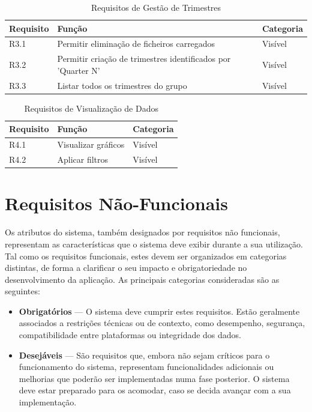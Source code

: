\begin{table}[h!]
\centering
\begin{tabular}{|l|p{7cm}|l|}
\hline
\textbf{Requisito} & \textbf{Função} & \textbf{Categoria} \\
\hline
R3.1 & Permitir eliminação de ficheiros carregados & Visível \\
R3.2 & Permitir criação de trimestres identificados por 'Quarter N' & Visível \\
R3.3 & Listar todos os trimestres do grupo & Visível \\
\hline
\end{tabular}
\caption{Requisitos de Gestão de Trimestres}
\label{tab:requisitosTrimestres}
\end{table}

\begin{table}[h!]
\centering
\begin{tabular}{|l|p{7cm}|l|}
\hline
\textbf{Requisito} & \textbf{Função} & \textbf{Categoria} \\
\hline
R4.1 & Visualizar gráficos & Visível \\
R4.2 & Aplicar filtros & Visível \\
\hline
\end{tabular}
\caption{Requisitos de Visualização de Dados}
\label{tab:requisitosVisualizacao}
\end{table}

\section{Requisitos Não-Funcionais}
Os atributos do sistema, também designados por requisitos não funcionais, representam as características que o sistema deve exibir durante a sua utilização. Tal como os requisitos funcionais, estes devem ser organizados em categorias distintas, de forma a clarificar o seu impacto e obrigatoriedade no desenvolvimento da aplicação. As principais categorias consideradas são as seguintes:

\begin{itemize}
\item \textbf{Obrigatórios} — O sistema deve cumprir estes requisitos. Estão geralmente associados a restrições técnicas ou de contexto, como desempenho, segurança, compatibilidade entre plataformas ou integridade dos dados.

\item \textbf{Desejáveis} — São requisitos que, embora não sejam críticos para o funcionamento do sistema, representam funcionalidades adicionais ou melhorias que poderão ser implementadas numa fase posterior. O sistema deve estar preparado para os acomodar, caso se decida avançar com a sua implementação.
\end{itemize}

